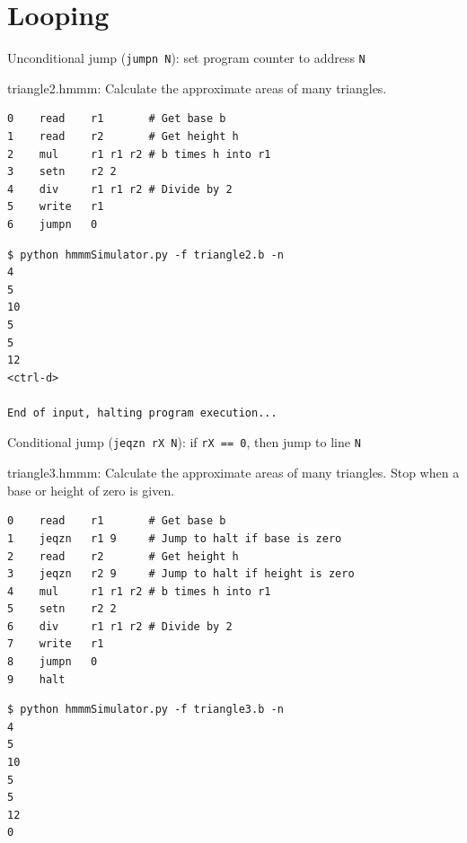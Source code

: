 \documentclass[8pt,a4paper,compress]{beamer}
\begin{document}
\section{Looping}
\begin{frame}[fragile]
\pause

Unconditional jump (\lstinline{jumpn N}): set program counter to address \lstinline{N}

\pause
\bigskip

\begin{framed}
\tiny triangle2.hmmm: Calculate the approximate areas of many triangles.
\end{framed}

\begin{lstlisting}[language={}]
0    read    r1       # Get base b
1    read    r2       # Get height h
2    mul     r1 r1 r2 # b times h into r1
3    setn    r2 2
4    div     r1 r1 r2 # Divide by 2
5    write   r1
6    jumpn   0
\end{lstlisting}

\pause

\begin{lstlisting}[language={}]
$ python hmmmSimulator.py -f triangle2.b -n
4
5
10
5
5
12
<ctrl-d>

End of input, halting program execution...
\end{lstlisting}
\end{frame}

\begin{frame}[fragile]
\pause

Conditional jump (\lstinline{jeqzn rX N}): if \lstinline{rX == 0}, then jump to line \lstinline{N}

\pause
\bigskip

\begin{framed}
\tiny triangle3.hmmm: Calculate the approximate areas of many triangles. Stop when a base or height of zero is given.
\end{framed}

\begin{lstlisting}[language={}]
0    read    r1       # Get base b
1    jeqzn   r1 9     # Jump to halt if base is zero
2    read    r2       # Get height h
3    jeqzn   r2 9     # Jump to halt if height is zero
4    mul     r1 r1 r2 # b times h into r1
5    setn    r2 2
6    div     r1 r1 r2 # Divide by 2
7    write   r1
8    jumpn   0
9    halt
\end{lstlisting}

\pause

\begin{lstlisting}[language={}]
$ python hmmmSimulator.py -f triangle3.b -n
4
5
10
5
5
12
0
\end{lstlisting}
\end{frame}
\end{document}
